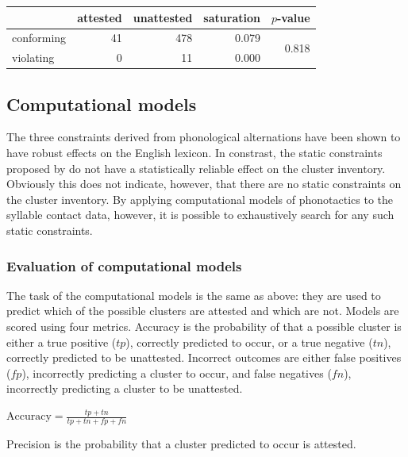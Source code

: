 \begin{example}
\begin{tabular}{l r r r r}
\toprule
           & attested & unattested & saturation & $p$-value \\
\midrule
conforming & 41       & 478        & 0.079      & \multirow{2}{*}{0.818} \\
violating  &  0       &  11        & 0.000                               \\
\bottomrule
\end{tabular}
\end{example}

\subsection{Computational models}

The three constraints derived from phonological alternations have been shown to have robust effects on the English lexicon. In constrast, the static constraints proposed by \citet{Pierrehumbert1994} do not have a statistically reliable effect on the cluster inventory. Obviously this does not indicate, however, that there are no static constraints on the cluster inventory. By applying computational models of phonotactics to the syllable contact data, however, it is possible to exhaustively search for any such static constraints. 

\subsubsection{Evaluation of computational models}

The task of the computational models is the same as above: they are used to predict which of the possible clusters are attested and which are not. Models are scored using four metrics. Accuracy is the probability of that a possible cluster is either a true positive ($tp$), correctly predicted to occur, or a true negative ($tn$), correctly predicted to be unattested. Incorrect outcomes are either false positives ($fp$), incorrectly predicting a cluster to occur, and false negatives ($fn$), incorrectly predicting a cluster to be unattested.

\begin{unlabeledexample}
$\displaystyle \textrm{Accuracy} = \frac{tp + tn}{tp + tn + fp + fn}$
\end{unlabeledexample}

Precision is the probability that a cluster predicted to occur is attested. 

